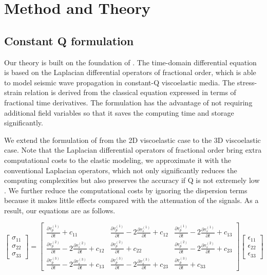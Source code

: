 \documentclass{paris17}
\begin{document}
\section{Method and Theory}

\subsection{Constant Q formulation}

Our theory is built on the foundation of \cite{zhu2014theory}. The time-domain differential equation is based on the Laplacian differential operators of fractional order, which is able to model seismic wave propagation in constant-Q viscoelastic media. The stress-strain relation is derived from the classical equation expressed in terms of fractional time derivatives. The formulation has the advantage of not requiring additional field variables so that it saves the computing time and storage significantly.

We extend the formulation of \cite{zhu2014theory} from the 2D viscoelastic case to the 3D viscoelastic case. Note that the Laplacian differential operators of fractional order bring extra computational costs to the elastic modeling, we approximate it with the conventional Laplacian operators, which not only significantly reduces the computing complexities but also preserves the accuracy if Q is not extremely low \cite[]{shen2015image}. We further reduce the computational costs by ignoring the dispersion terms because it makes little effects compared with the attenuation of the signals. As a result, our equations are as follows.

\begin{equation}
\begin{bmatrix} \sigma_{11}\\ \sigma_{22}\\ \sigma_{33} \end{bmatrix} = \begin{bmatrix} \frac{\partial \tau_p^{(1)}}{\partial t} + c_{11} & \frac{\partial \tau_p^{(1)}}{\partial t} - 2\frac{\partial \tau_s^{(1)}}{\partial t} +c_{12}& \frac{\partial \tau_p^{(1)}}{\partial t} - 2\frac{\partial \tau_s^{(1)}}{\partial t} +c_{13} \\ \frac{\partial \tau_p^{(2)}}{\partial t} - 2\frac{\partial \tau_s^{(2)}}{\partial t} +c_{12}& \frac{\partial \tau_p^{(2)}}{\partial t} + c_{22} & \frac{\partial \tau_p^{(2)}}{\partial t} - 2\frac{\partial \tau_s^{(2)}}{\partial t} +c_{23}\\ \frac{\partial \tau_p^{(3)}}{\partial t} - 2\frac{\partial \tau_s^{(3)}}{\partial t} +c_{13} & \frac{\partial \tau_p^{(3)}}{\partial t} - 2\frac{\partial \tau_s^{(3)}}{\partial t} +c_{23} & \frac{\partial \tau_p^{(3)}}{\partial t} + c_{33} \end{bmatrix} \begin{bmatrix} \epsilon_{11}\\ \epsilon_{22}\\ \epsilon_{33} \end{bmatrix}
\end{equation}
\end{document}
